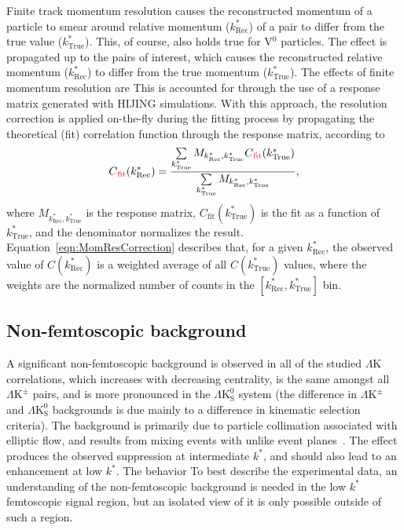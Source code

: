\documentclass[ALICE,manyauthors]{cernphprep}
\newcommand{\kstar}{$k^{*}$\xspace}
\newcommand{\ktrue}{$k^{*}_{\mathrm{True}}$\xspace}
\newcommand{\krec}{$k^{*}_{\mathrm{Rec}}$\xspace}
\newcommand{\LamK}{$\Lambda$K\xspace}
\newcommand{\LamKpm}{$\Lambda\mathrm{K^{\pm}}$\xspace}
\newcommand{\LamKs}{$\Lambda\mathrm{K^{0}_{S}}$\xspace}
\newcommand{\Vz}{V$^{0}$\xspace}
\begin{document}
Finite track momentum resolution causes the reconstructed {\color{red}momentum of a particle to smear around} {\color{blue}relative momentum (\krec) of a pair to differ from} the true value {\color{blue}(\ktrue)}.
{\color{red}This, of course, also holds true for \Vz particles.
The effect is propagated up to the pairs of interest, which causes the reconstructed relative momentum (\krec) to differ from the true momentum (\ktrue).}
{\color{red}The effects of finite momentum resolution are} {\color{blue}This is} accounted for through the use of a response matrix generated with HIJING simulations.
With this approach, the resolution correction is applied on-the-fly during the fitting process by propagating the theoretical (fit) correlation function through the response matrix, according to
\begin{equation}
  C{\color{red}_{\mathrm{fit}}}(k^{*}_{\mathrm{Rec}}) = \dfrac{\sum\limits_{k^{*}_{\mathrm{True}}}M_{k^{*}_{\mathrm{Rec}},k^{*}_{\mathrm{True}}}C{\color{red}_{\mathrm{fit}}}(k^{*}_{\mathrm{True}})}{\sum\limits_{k^{*}_{\mathrm{True}}}M_{k^{*}_{\mathrm{Rec}},k^{*}_{\mathrm{True}}}},
\label{eqn:MomResCorrection}
\end{equation}
where $M_{k^{*}_{\mathrm{Rec}},k^{*}_{\mathrm{True}}}$ is the response matrix, $C_{\mathrm{fit}}(k^{*}_{\mathrm{True}})$ is the fit as a function of \ktrue, and the denominator normalizes the result.
{\color{red}Equation~\ref{eqn:MomResCorrection} describes that, for a given \krec, the observed value of $C(k^{*}_{\mathrm{Rec}})$ is a weighted average of all $C(k^{*}_{\mathrm{True}})$ values, where the weights are the normalized number of counts in the \mbox{$[k^{*}_{\mathrm{Rec}}, k^{*}_{\mathrm{True}}]$} bin.}


\subsection{Non-femtoscopic background}
\label{NonFlatBackground}

A significant non-femtoscopic background is observed in all of the studied \LamK correlations, which increases with decreasing centrality, is the same amongst all \LamKpm pairs, and is more pronounced in the \LamKs system (the difference in \LamKpm and \LamKs backgrounds is due mainly to a difference in kinematic selection criteria).  
The background is primarily due to particle collimation associated with elliptic flow, and results from mixing events with unlike event planes~\cite{Kisiel:2017}.
The effect produces the observed suppression at intermediate \kstar, and should also lead to an enhancement at low \kstar.
{\color{red}The behavior} {\color{blue}To best describe the experimental data, an understanding} of the non-femtoscopic background is needed in the low \kstar femtoscopic signal region, but an isolated view of it is only possible outside of such a region.
\end{document}
